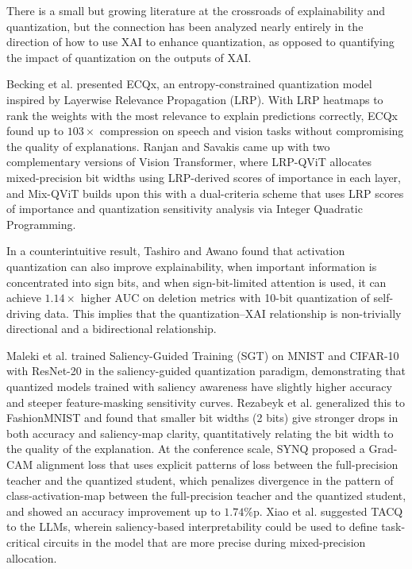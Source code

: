 \documentclass[fleqn,10pt]{wlscirep}
\begin{document}
There is a small but growing literature at the crossroads of explainability and quantization, but the connection has been analyzed nearly entirely in the direction of how to use XAI to enhance quantization, as opposed to quantifying the impact of quantization on the outputs of XAI.

Becking et al.\cite{Becking2022ecqx} presented ECQx, an entropy-constrained quantization model inspired by Layerwise Relevance Propagation (LRP). With LRP heatmaps to rank the weights with the most relevance to explain predictions correctly, ECQx found up to $103\times$ compression on speech and vision tasks without compromising the quality of explanations. Ranjan and Savakis came up with two complementary versions of Vision Transformer, where LRP-QViT\cite{Ranjan2024lrpqvit} allocates mixed-precision bit widths using LRP-derived scores of importance in each layer, and Mix-QViT\cite{Ranjan2025mixqvit} builds upon this with a dual-criteria scheme that uses LRP scores of importance and quantization sensitivity analysis via Integer Quadratic Programming.

In a counterintuitive result, Tashiro and Awano\cite{Tashiro2023attention} found that activation quantization can also improve explainability, when important information is concentrated into sign bits, and when sign-bit-limited attention is used, it can achieve $1.14\times$ higher AUC on deletion metrics with 10-bit quantization of self-driving data. This implies that the quantization--XAI relationship is non-trivially directional and a bidirectional relationship.

Maleki et al.\cite{Maleki2024quantized} trained Saliency-Guided Training (SGT) on MNIST and CIFAR-10 with ResNet-20 in the saliency-guided quantization paradigm, demonstrating that quantized models trained with saliency awareness have slightly higher accuracy and steeper feature-masking sensitivity curves. Rezabeyk et al.\cite{Rezabeyk2024saliency} generalized this to FashionMNIST and found that smaller bit widths (2 bits) give stronger drops in both accuracy and saliency-map clarity, quantitatively relating the bit width to the quality of the explanation. At the conference scale, SYNQ\cite{Kim2025synq} proposed a Grad-CAM alignment loss that uses explicit patterns of loss between the full-precision teacher and the quantized student, which penalizes divergence in the pattern of class-activation-map between the full-precision teacher and the quantized student, and showed an accuracy improvement up to $1.74\%$p. Xiao et al.\cite{Xiao2025tacq} suggested TACQ to the LLMs, wherein saliency-based interpretability could be used to define task-critical circuits in the model that are more precise during mixed-precision allocation.
\end{document}
